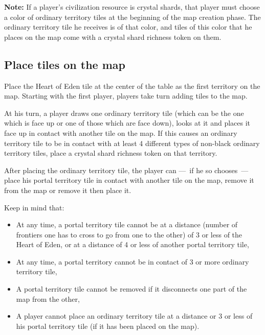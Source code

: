 \documentclass[a4paper]{article}
\begin{document}
        \textbf{Note:} If a player's civilization resource is crystal shards,
        that player must choose a color of ordinary territory tiles
        at the beginning of the map creation phase.
        The ordinary territory tile he receives is of that color,
        and tiles of this color that he places on the map come with
        a crystal shard richness token on them.
      
    \subsection{Place tiles on the map}
        \label{map-tiles}
        Place the Heart of Eden tile at the center of the table as the first
        territory on the map.
        Starting with the first player, players take turn adding tiles to the map.
        
        At his turn, a player draws one ordinary territory tile
        (which can be the one which is face up or one of those which are face down),
        looks at it and places it face up in contact with another tile on the map.
        If this causes an ordinary territory tile to be in contact with at least
        4 different types of non-black ordinary territory tiles,
        place a crystal shard richness token on that territory.
        
        After placing the ordinary territory tile, the player can ---~if he so chooses~---
        place his portal territory tile in contact with another tile on the map,
        remove it from the map or remove it then place it.
        
\newpage
        Keep in mind that:
        \vspace{-1.3em}
        \begin{itemize}
            \item At any time, a portal territory tile cannot be at a distance
                (number of frontiers one has to cross to go from one to the other)
                of 3 or less of the Heart of Eden,
                or at a distance of 4 or less of another portal territory tile,
            \item At any time, a portal territory cannot be in contact of 3 or more
                ordinary territory tile,
            \item A portal territory tile cannot be removed
                if it disconnects one part of the map from the other,
            \item A player cannot place an ordinary territory tile at a distance
                or 3 or less of his portal territory tile (if it has been placed on the map).
        \end{itemize}
        
\end{document}
